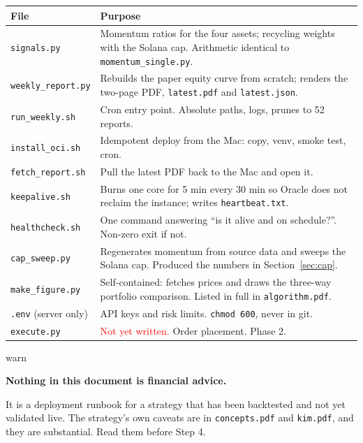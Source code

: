 \documentclass[11pt,a4paper]{article}
\begin{document}
\vspace{0.3em}
\begin{tabular}{@{}p{4.6cm}p{9.3cm}@{}}
    \toprule
    \textbf{File} & \textbf{Purpose} \\
    \midrule
    \texttt{signals.py} &
    Momentum ratios for the four assets; recycling weights with the
    Solana cap. Arithmetic identical to \texttt{momentum\_single.py}. \\
    \texttt{weekly\_report.py} &
    Rebuilds the paper equity curve from scratch; renders the two-page
    PDF, \texttt{latest.pdf} and \texttt{latest.json}. \\
    \texttt{run\_weekly.sh} &
    Cron entry point. Absolute paths, logs, prunes to 52 reports. \\
    \texttt{install\_oci.sh} &
    Idempotent deploy from the Mac: copy, venv, smoke test, cron. \\
    \texttt{fetch\_report.sh} &
    Pull the latest PDF back to the Mac and open it. \\
    \texttt{keepalive.sh} &
    Burns one core for 5 min every 30 min so Oracle does not reclaim the
    instance; writes \texttt{heartbeat.txt}. \\
    \texttt{healthcheck.sh} &
    One command answering ``is it alive and on schedule?''. Non-zero exit
    if not. \\
    \texttt{cap\_sweep.py} &
    Regenerates momentum from source data and sweeps the Solana cap.
    Produced the numbers in Section~\ref{sec:cap}. \\
    \texttt{make\_figure.py} &
    Self-contained: fetches prices and draws the three-way portfolio
    comparison. Listed in full in \texttt{algorithm.pdf}. \\
    \texttt{.env} (server only) &
    API keys and risk limits. \texttt{chmod 600}, never in git. \\
    \texttt{execute.py} &
    \textcolor{red}{Not yet written.} Order placement. Phase 2. \\
    \bottomrule
\end{tabular}

\vspace{1.5em}
\begin{resultbox}[]{warn}
\begin{center}
\Large\bfseries Nothing in this document is financial advice.
\end{center}
\vspace{0.3em}
\centering
It is a deployment runbook for a strategy that has been backtested and
not yet validated live. The strategy's own caveats are in
\texttt{concepts.pdf} and \texttt{kim.pdf}, and they are substantial.
Read them before Step 4.
\end{resultbox}
\end{document}
